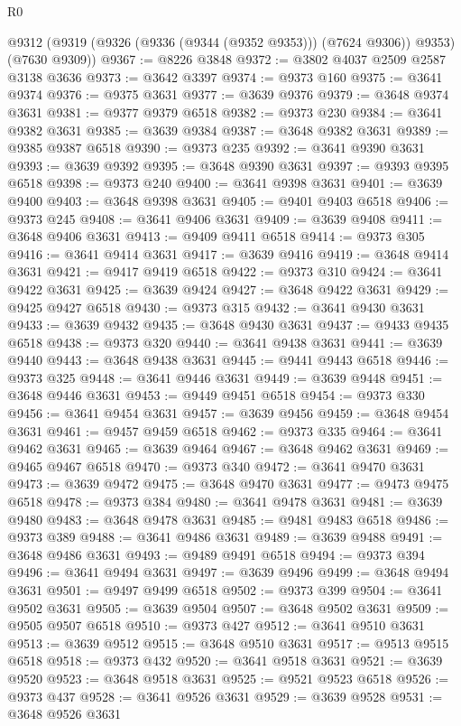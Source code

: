 \begin{lexlean}{R0}
\begin{coremodule}
    @9312 (@9319 (@9326 (@9336 (@9344 (@9352 @9353))) (@7624 @9306)) @9353) (@7630 @9309))
@9367 := @8226 @3848
@9372 := @3802 @4037 @2509 @2587 @3138 @3636
@9373 := @3642 @3397
@9374 := @9373 @160
@9375 := @3641 @9374
@9376 := @9375 @3631
@9377 := @3639 @9376
@9379 := @3648 @9374 @3631
@9381 := @9377 @9379 @6518
@9382 := @9373 @230
@9384 := @3641 @9382 @3631
@9385 := @3639 @9384
@9387 := @3648 @9382 @3631
@9389 := @9385 @9387 @6518
@9390 := @9373 @235
@9392 := @3641 @9390 @3631
@9393 := @3639 @9392
@9395 := @3648 @9390 @3631
@9397 := @9393 @9395 @6518
@9398 := @9373 @240
@9400 := @3641 @9398 @3631
@9401 := @3639 @9400
@9403 := @3648 @9398 @3631
@9405 := @9401 @9403 @6518
@9406 := @9373 @245
@9408 := @3641 @9406 @3631
@9409 := @3639 @9408
@9411 := @3648 @9406 @3631
@9413 := @9409 @9411 @6518
@9414 := @9373 @305
@9416 := @3641 @9414 @3631
@9417 := @3639 @9416
@9419 := @3648 @9414 @3631
@9421 := @9417 @9419 @6518
@9422 := @9373 @310
@9424 := @3641 @9422 @3631
@9425 := @3639 @9424
@9427 := @3648 @9422 @3631
@9429 := @9425 @9427 @6518
@9430 := @9373 @315
@9432 := @3641 @9430 @3631
@9433 := @3639 @9432
@9435 := @3648 @9430 @3631
@9437 := @9433 @9435 @6518
@9438 := @9373 @320
@9440 := @3641 @9438 @3631
@9441 := @3639 @9440
@9443 := @3648 @9438 @3631
@9445 := @9441 @9443 @6518
@9446 := @9373 @325
@9448 := @3641 @9446 @3631
@9449 := @3639 @9448
@9451 := @3648 @9446 @3631
@9453 := @9449 @9451 @6518
@9454 := @9373 @330
@9456 := @3641 @9454 @3631
@9457 := @3639 @9456
@9459 := @3648 @9454 @3631
@9461 := @9457 @9459 @6518
@9462 := @9373 @335
@9464 := @3641 @9462 @3631
@9465 := @3639 @9464
@9467 := @3648 @9462 @3631
@9469 := @9465 @9467 @6518
@9470 := @9373 @340
@9472 := @3641 @9470 @3631
@9473 := @3639 @9472
@9475 := @3648 @9470 @3631
@9477 := @9473 @9475 @6518
@9478 := @9373 @384
@9480 := @3641 @9478 @3631
@9481 := @3639 @9480
@9483 := @3648 @9478 @3631
@9485 := @9481 @9483 @6518
@9486 := @9373 @389
@9488 := @3641 @9486 @3631
@9489 := @3639 @9488
@9491 := @3648 @9486 @3631
@9493 := @9489 @9491 @6518
@9494 := @9373 @394
@9496 := @3641 @9494 @3631
@9497 := @3639 @9496
@9499 := @3648 @9494 @3631
@9501 := @9497 @9499 @6518
@9502 := @9373 @399
@9504 := @3641 @9502 @3631
@9505 := @3639 @9504
@9507 := @3648 @9502 @3631
@9509 := @9505 @9507 @6518
@9510 := @9373 @427
@9512 := @3641 @9510 @3631
@9513 := @3639 @9512
@9515 := @3648 @9510 @3631
@9517 := @9513 @9515 @6518
@9518 := @9373 @432
@9520 := @3641 @9518 @3631
@9521 := @3639 @9520
@9523 := @3648 @9518 @3631
@9525 := @9521 @9523 @6518
@9526 := @9373 @437
@9528 := @3641 @9526 @3631
@9529 := @3639 @9528
@9531 := @3648 @9526 @3631

\end{coremodule}
\end{lexlean}
